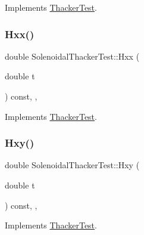 Implements \hyperlink{classThackerTest_a9a8565b3a9e9bf1e56407d2844bd8517}{Thacker\+Test}.

\mbox{\label{classSolenoidalThackerTest_adf33889c1fe87e10802f321c509aceb7}} 
\subsubsection{\texorpdfstring{Hxx()}{Hxx()}}
{\footnotesize\ttfamily double Solenoidal\+Thacker\+Test\+::\+Hxx (\begin{DoxyParamCaption}\item[{double}]{t }\end{DoxyParamCaption}) const\hspace{0.3cm}{\ttfamily [inline]}, {\ttfamily [override]}, {\ttfamily [virtual]}}



Implements \hyperlink{classThackerTest_a137a136dd1261b4a97a63831841d611b}{Thacker\+Test}.

\mbox{\label{classSolenoidalThackerTest_a8bbfec9bd72ad250dcf229742646754f}} 
\subsubsection{\texorpdfstring{Hxy()}{Hxy()}}
{\footnotesize\ttfamily double Solenoidal\+Thacker\+Test\+::\+Hxy (\begin{DoxyParamCaption}\item[{double}]{t }\end{DoxyParamCaption}) const\hspace{0.3cm}{\ttfamily [inline]}, {\ttfamily [override]}, {\ttfamily [virtual]}}



Implements \hyperlink{classThackerTest_a309f6008f53c7084163ce52cd381efc7}{Thacker\+Test}.

\mbox{\label{classSolenoidalThackerTest_af5a3b7eb4581a2362307105ea74f25f0}} 
